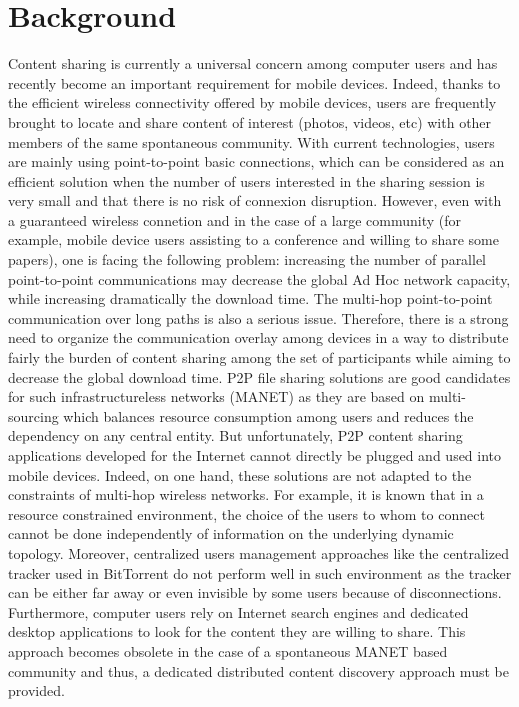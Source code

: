 \chapter{Background}
\label{chapter:background}
\minitoc

Content sharing is currently a universal concern among computer users and has recently become an important requirement for mobile devices. Indeed, thanks to the efficient wireless connectivity offered by mobile devices, users are frequently brought to locate and share content of interest (photos, videos, etc) with other members of the same spontaneous community. With current technologies, users are mainly using point-to-point basic connections, which can be considered as an efficient solution when the number of users interested in the sharing session is very small and that there is no risk of connexion disruption. However, even with a guaranteed wireless connetion and in the case of a large community (for example, mobile device users assisting to a conference and willing to share some papers), one is facing the following problem: increasing the number of parallel point-to-point communications may decrease the global Ad Hoc network capacity, while increasing dramatically the download time. The multi-hop point-to-point communication over long paths is also a serious issue. Therefore, there is a strong need to organize the communication overlay among devices in a way to distribute fairly the burden of content sharing among the set of participants while aiming to decrease the global download time. P2P file sharing solutions are good candidates for such infrastructureless networks (MANET) as they are based on multi-sourcing which balances resource consumption among users and reduces the dependency on any central entity. But unfortunately, P2P content sharing applications developed for the Internet cannot directly be plugged and used into mobile devices. Indeed, on one hand, these solutions are not adapted to the constraints of multi-hop wireless networks. For example, it is known that in a resource constrained environment, the choice of the users to whom to connect cannot be done independently of information on the underlying dynamic topology. Moreover, centralized users management approaches like the centralized tracker used in BitTorrent do not perform well in such environment as the tracker can be either far away or even invisible by some users because of disconnections. Furthermore, computer users rely on Internet search engines and dedicated desktop applications to look for the content they are willing to share. This approach becomes obsolete in the case of a spontaneous MANET based community and thus, a dedicated distributed content discovery approach must be provided. 

